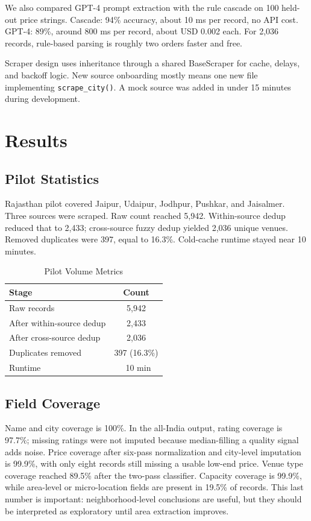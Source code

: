 \documentclass[conference]{IEEEtran}
\begin{document}
We also compared GPT-4 prompt extraction with the rule cascade on 100 held-out price strings. Cascade: 94\% accuracy, about 10 ms per record, no API cost. GPT-4: 89\%, around 800 ms per record, about USD 0.002 each. For 2,036 records, rule-based parsing is roughly two orders faster and free.

Scraper design uses inheritance through a shared BaseScraper for cache, delays, and backoff logic. New source onboarding mostly means one new file implementing \texttt{scrape\_city()}. A mock source was added in under 15 minutes during development.

\section{Results}

\subsection{Pilot Statistics}

Rajasthan pilot covered Jaipur, Udaipur, Jodhpur, Pushkar, and Jaisalmer. Three sources were scraped. Raw count reached 5,942. Within-source dedup reduced that to 2,433; cross-source fuzzy dedup yielded 2,036 unique venues. Removed duplicates were 397, equal to 16.3\%. Cold-cache runtime stayed near 10 minutes.

\begin{table}[htbp]
\caption{Pilot Volume Metrics}
\begin{center}
\begin{tabular}{|l|c|}
\hline
\textbf{Stage} & \textbf{Count} \\
\hline
Raw records & 5,942 \\
\hline
After within-source dedup & 2,433 \\
\hline
After cross-source dedup & 2,036 \\
\hline
Duplicates removed & 397 (16.3\%) \\
\hline
Runtime & ~10 min \\
\hline
\end{tabular}
\label{tab:volume}
\end{center}
\end{table}

\subsection{Field Coverage}

Name and city coverage is 100\%. In the all-India output, rating coverage is 97.7\%; missing ratings were not imputed because median-filling a quality signal adds noise. Price coverage after six-pass normalization and city-level imputation is 99.9\%, with only eight records still missing a usable low-end price. Venue type coverage reached 89.5\% after the two-pass classifier. Capacity coverage is 99.9\%, while area-level or micro-location fields are present in 19.5\% of records. This last number is important: neighborhood-level conclusions are useful, but they should be interpreted as exploratory until area extraction improves.
\end{document}
